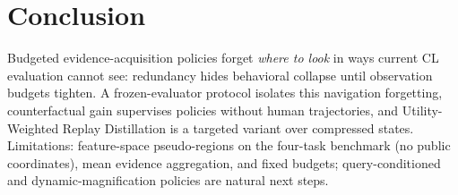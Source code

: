 \documentclass{article}
\begin{document}
\section{Conclusion}
\label{sec:conclusion}

Budgeted evidence-acquisition policies forget \emph{where to look} in ways
current CL evaluation cannot see: redundancy hides behavioral collapse until
observation budgets tighten. A frozen-evaluator protocol isolates this
navigation forgetting, counterfactual gain supervises policies without human
trajectories, and Utility-Weighted Replay Distillation is a targeted variant
over compressed states. Limitations: feature-space
pseudo-regions on the four-task benchmark (no public coordinates), mean
evidence aggregation, and fixed budgets; query-conditioned and
dynamic-magnification policies are natural next steps.

\vfill\pagebreak



\end{document}
